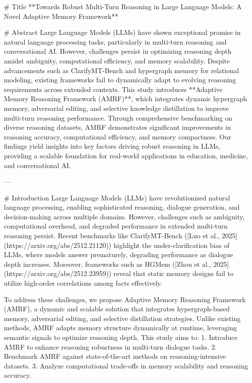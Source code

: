 # Title  
**Towards Robust Multi-Turn Reasoning in Large Language Models: A Novel Adaptive Memory Framework**

# Abstract  
Large Language Models (LLMs) have shown exceptional promise in natural language processing tasks, particularly in multi-turn reasoning and conversational AI. However, challenges persist in optimizing reasoning depth amidst ambiguity, computational efficiency, and memory scalability. Despite advancements such as ClarifyMT-Bench and hypergraph memory for relational modeling, existing frameworks fail to dynamically adapt to evolving reasoning requirements across extended contexts. This study introduces **Adaptive Memory Reasoning Framework (AMRF)**, which integrates dynamic hypergraph memory, adversarial editing, and selective knowledge distillation to improve multi-turn reasoning performance. Through comprehensive benchmarking on diverse reasoning datasets, AMRF demonstrates significant improvements in reasoning accuracy, computational efficiency, and memory compactness. Our findings yield insights into key factors driving robust reasoning in LLMs, providing a scalable foundation for real-world applications in education, medicine, and conversational AI.

---

# Introduction  
Large Language Models (LLMs) have revolutionized natural language processing, enabling sophisticated reasoning, dialogue generation, and decision-making across multiple domains. However, challenges such as ambiguity, computational overhead, and degraded performance in extended multi-turn reasoning persist. Recent benchmarks like ClarifyMT-Bench ([Luo et al., 2025](https://arxiv.org/abs/2512.21120)) highlight the under-clarification bias of LLMs, where models answer prematurely, degrading performance as dialogue depth increases. Moreover, frameworks such as HGMem ([Zhou et al., 2025](https://arxiv.org/abs/2512.23959)) reveal that static memory designs fail to utilize high-order correlations among facts effectively.  

To address these challenges, we propose Adaptive Memory Reasoning Framework (AMRF), a dynamic and scalable solution that integrates hypergraph-based memory, adversarial editing, and selective distillation strategies. Unlike existing methods, AMRF adapts memory structure dynamically at runtime, leveraging semantic signals to optimize reasoning depth. This study aims to:  
1. Introduce AMRF to enhance reasoning robustness in multi-turn dialogue tasks.  
2. Benchmark AMRF against state-of-the-art methods on reasoning-intensive datasets.  
3. Analyze computational trade-offs in memory scalability and reasoning accuracy.  

